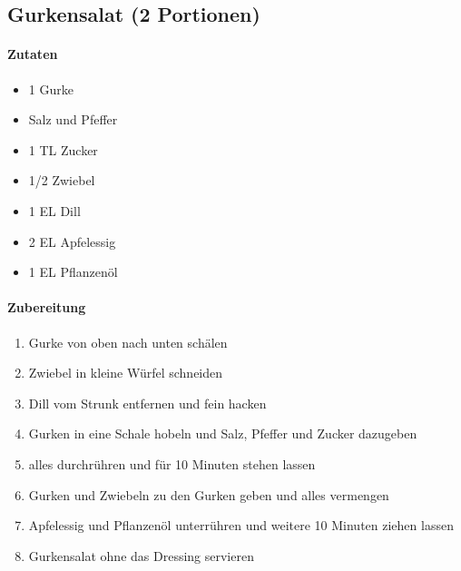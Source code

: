 \newpage
\subsection{Gurkensalat (2 Portionen)}
\paragraph{Zutaten}
\begin{itemize}[noitemsep]
	\item 1 Gurke
	\item Salz und Pfeffer
	\item 1 TL Zucker
	\item 1/2 Zwiebel
	\item 1 EL Dill
	\item 2 EL Apfelessig
	\item 1 EL Pflanzenöl
\end{itemize}
\paragraph{Zubereitung}
\begin{enumerate}[noitemsep]
	\item Gurke von oben nach unten schälen
	\item Zwiebel in kleine Würfel schneiden
	\item Dill vom Strunk entfernen und fein hacken
	\item Gurken in eine Schale hobeln und Salz, Pfeffer und Zucker dazugeben 
	\item alles durchrühren und für 10 Minuten stehen lassen
	\item Gurken und Zwiebeln zu den Gurken geben und alles vermengen
	\item Apfelessig und Pflanzenöl unterrühren und weitere 10 Minuten ziehen lassen
	\item Gurkensalat ohne das Dressing servieren
\end{enumerate}
